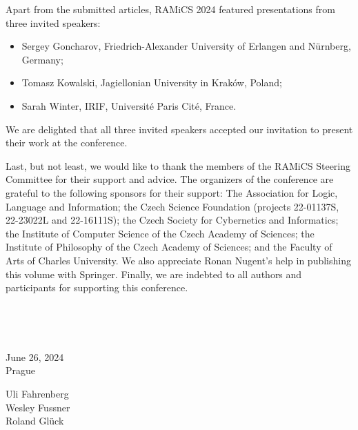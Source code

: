 \documentclass{llncs}
\begin{document}
Apart from the submitted articles, RAMiCS 2024 featured presentations from 
three invited speakers:
\begin{itemize}
\item Sergey Goncharov, Friedrich-Alexander University of Erlangen and Nürnberg, Germany;
\item Tomasz Kowalski, Jagiellonian University in Kraków, Poland;
\item Sarah Winter, IRIF, Université Paris Cité, France.
\end{itemize}
We are delighted that all three invited speakers accepted our invitation to 
present their work at the conference.

Last, but not least, we would like to thank the members of the RAMiCS
Steering Committee for their support and advice. The organizers of the conference are grateful to the following sponsors for their support: The Association for Logic, Language and Information; the Czech Science Foundation (projects 22-01137S, 22-23022L and 22-16111S); the Czech Society for Cybernetics and Informatics; the Institute of Computer Science of the Czech Academy of Sciences; the Institute of Philosophy of the Czech Academy of Sciences; and the Faculty of Arts of Charles University.
We also appreciate Ronan Nugent's help in publishing this volume with Springer. Finally, we
are indebted to all authors and participants for supporting this
conference.

 



~\bigskip


\noindent
\begin{minipage}[t]{.4\textwidth}
June 26, 2024\\
Prague
\end{minipage}%
\hfill
\begin{minipage}[t]{.4\textwidth}\flushright
  Uli Fahrenberg \\
  Wesley Fussner \\
  Roland Gl\"uck
\end{minipage}
\end{document}
